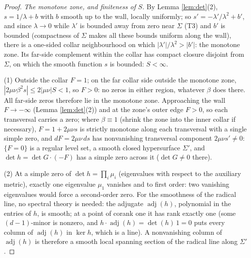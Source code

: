 \documentclass[11pt]{article}
\theoremstyle{definition}
\newcommand{\Sig}{\Sigma}
\begin{document}
\begin{proof}
\emph{The monotone zone, and finiteness of $S$.} By Lemma \ref{lem:det}(2), $s = 1/\lambda + b$ with $b$ smooth up to the wall, locally uniformly; so $s' = -\lambda'/\lambda^2 + b'$, and since $\lambda \to 0$ while $\lambda'$ is bounded away from zero near $\Sig$ (T3) and $b'$ is bounded (compactness of $\Sig$ makes all these bounds uniform along the wall), there is a one-sided collar neighbourhood on which $|\lambda'|/\lambda^2 > |b'|$: the monotone zone. Its far-side complement within the collar has compact closure disjoint from $\Sig$, on which the smooth function $s$ is bounded: $S < \infty$.

(1) Outside the collar $F = 1$; on the far collar side outside the monotone zone, $|2\mu\nu\beta^2 s| \leq 2|\mu\nu| S < 1$, so $F > 0$: no zeros in either region, whatever $\beta$ does there. All far-side zeros therefore lie in the monotone zone. Approaching the wall $F \to -\infty$ (Lemma \ref{lem:det}(2)) and at the zone's outer edge $F > 0$, so each transversal carries a zero; where $\beta \equiv 1$ (shrink the zone into the inner collar if necessary), $F = 1 + 2\mu\nu s$ is strictly monotone along each transversal with a single simple zero, and $dF = 2\mu\nu\, ds$ has nonvanishing transversal component $2\mu\nu s' \neq 0$: $\{F = 0\}$ is a regular level set, a smooth closed hypersurface $\Sig'$, and $\det h = \det G \cdot (-F)$ has a simple zero across it ($\det G \neq 0$ there).

(2) At a simple zero of $\det h = \prod_i \mu_i$ (eigenvalues with respect to the auxiliary metric), exactly one eigenvalue $\mu_1$ vanishes and to first order: two vanishing eigenvalues would force a second-order zero. For the smoothness of the radical line, no spectral theory is needed: the adjugate $\operatorname{adj}(h)$, polynomial in the entries of $h$, is smooth; at a point of corank one it has rank exactly one (some $(d{-}1)$-minor is nonzero, and $h \cdot \operatorname{adj}(h) = \det(h)\,1 = 0$ puts every column of $\operatorname{adj}(h)$ in $\ker h$, which is a line). A nonvanishing column of $\operatorname{adj}(h)$ is therefore a smooth local spanning section of the radical line along $\Sig'$.


\end{proof}
\end{document}
